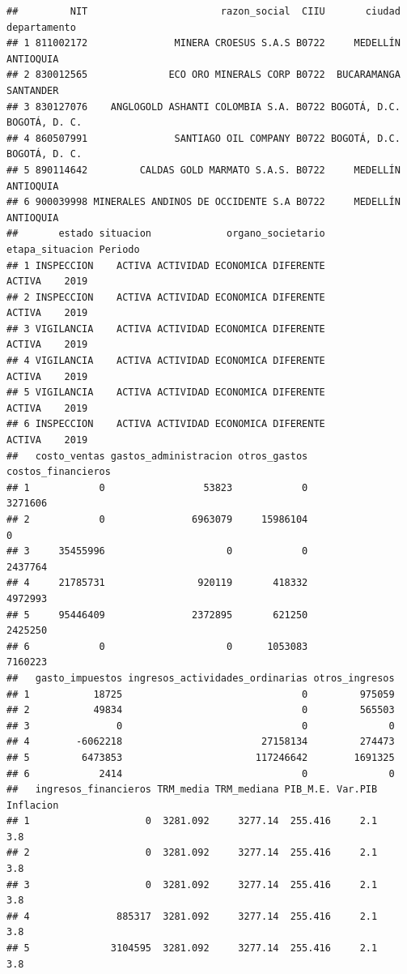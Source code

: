 \documentclass[
  11pt,
]{article}
\begin{document}
\begin{verbatim}
##         NIT                       razon_social  CIIU       ciudad  departamento
## 1 811002172               MINERA CROESUS S.A.S B0722     MEDELLÍN     ANTIOQUIA
## 2 830012565              ECO ORO MINERALS CORP B0722  BUCARAMANGA     SANTANDER
## 3 830127076    ANGLOGOLD ASHANTI COLOMBIA S.A. B0722 BOGOTÁ, D.C. BOGOTÁ, D. C.
## 4 860507991               SANTIAGO OIL COMPANY B0722 BOGOTÁ, D.C. BOGOTÁ, D. C.
## 5 890114642         CALDAS GOLD MARMATO S.A.S. B0722     MEDELLÍN     ANTIOQUIA
## 6 900039998 MINERALES ANDINOS DE OCCIDENTE S.A B0722     MEDELLÍN     ANTIOQUIA
##       estado situacion             organo_societario etapa_situacion Periodo
## 1 INSPECCION    ACTIVA ACTIVIDAD ECONOMICA DIFERENTE          ACTIVA    2019
## 2 INSPECCION    ACTIVA ACTIVIDAD ECONOMICA DIFERENTE          ACTIVA    2019
## 3 VIGILANCIA    ACTIVA ACTIVIDAD ECONOMICA DIFERENTE          ACTIVA    2019
## 4 VIGILANCIA    ACTIVA ACTIVIDAD ECONOMICA DIFERENTE          ACTIVA    2019
## 5 VIGILANCIA    ACTIVA ACTIVIDAD ECONOMICA DIFERENTE          ACTIVA    2019
## 6 INSPECCION    ACTIVA ACTIVIDAD ECONOMICA DIFERENTE          ACTIVA    2019
##   costo_ventas gastos_administracion otros_gastos costos_financieros
## 1            0                 53823            0            3271606
## 2            0               6963079     15986104                  0
## 3     35455996                     0            0            2437764
## 4     21785731                920119       418332            4972993
## 5     95446409               2372895       621250            2425250
## 6            0                     0      1053083            7160223
##   gasto_impuestos ingresos_actividades_ordinarias otros_ingresos
## 1           18725                               0         975059
## 2           49834                               0         565503
## 3               0                               0              0
## 4        -6062218                        27158134         274473
## 5         6473853                       117246642        1691325
## 6            2414                               0              0
##   ingresos_financieros TRM_media TRM_mediana PIB_M.E. Var.PIB Inflacion
## 1                    0  3281.092     3277.14  255.416     2.1       3.8
## 2                    0  3281.092     3277.14  255.416     2.1       3.8
## 3                    0  3281.092     3277.14  255.416     2.1       3.8
## 4               885317  3281.092     3277.14  255.416     2.1       3.8
## 5              3104595  3281.092     3277.14  255.416     2.1       3.8

\end{verbatim}
\end{document}

